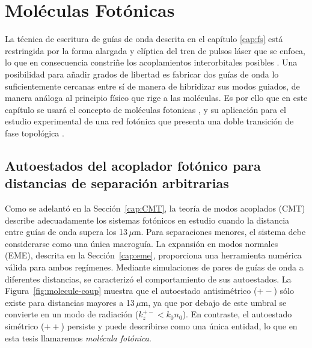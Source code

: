 \chapter{Moléculas Fotónicas}

La técnica de escritura de guías de onda descrita en el capítulo \ref{cap:fs} está restringida por la forma alargada y elíptica del tren de pulsos láser que se enfoca, lo que en consecuencia constriñe los acoplamientos interorbitales posibles \citep{interorbital}. Una posibilidad para añadir grados de libertad es fabricar dos guías de onda lo suficientemente cercanas entre sí de manera de hibridizar sus modos guiados, de manera análoga al principio físico que rige a las moléculas. Es por ello que en este capítulo se usará el concepto de moléculas fotonicas \citep{molecules}, y su aplicación para el estudio experimental de una red fotónica que presenta una doble transición de fase topológica \citep{SPSSH}.

\section{Autoestados del acoplador fotónico para distancias de separación arbitrarias}

Como se adelantó en la Sección~\ref{cap:CMT}, la teoría de modos acoplados (CMT) describe adecuadamente los sistemas fotónicos en estudio cuando la distancia entre guías de onda supera los 13\,$\mu$m. Para separaciones menores, el sistema debe considerarse como una única macroguía. La expansión en modos normales (EME), descrita en la Sección~\ref{cap:eme}, proporciona una herramienta numérica válida para ambos regímenes. Mediante simulaciones de pares de guías de onda a diferentes distancias, se caracterizó el comportamiento de sus autoestados. La Figura~\ref{fig:molecule-coup} muestra que el autoestado antisimétrico ($+-$) sólo existe para distancias mayores a 13\,$\mu$m, ya que por debajo de este umbral se convierte en un modo de radiaci\'on ($k_z^{+-} < k_0 n_0$). En contraste, el autoestado simétrico ($++$) persiste y puede describirse como una única entidad, lo que en esta tesis llamaremos \textit{molécula fotónica}.

